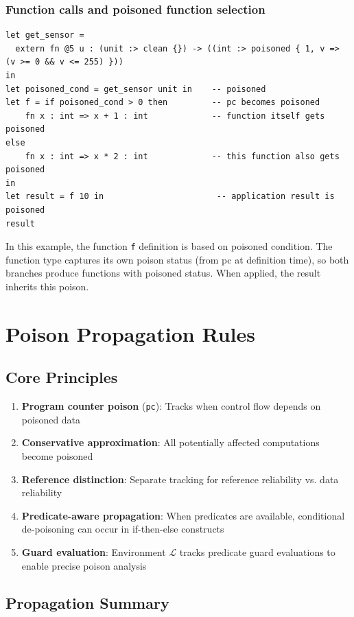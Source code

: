 \documentclass[12pt]{article}
\begin{document}
\subsubsection*{Function calls and poisoned function selection}
\begin{lstlisting}[language=poison]
let get_sensor =
  extern fn @5 u : (unit :> clean {}) -> ((int :> poisoned { 1, v => (v >= 0 && v <= 255) }))
in
let poisoned_cond = get_sensor unit in    -- poisoned
let f = if poisoned_cond > 0 then         -- pc becomes poisoned
    fn x : int => x + 1 : int             -- function itself gets poisoned
else
    fn x : int => x * 2 : int             -- this function also gets poisoned
in
let result = f 10 in                       -- application result is poisoned
result
\end{lstlisting}

In this example, the function \texttt{f} definition is based on poisoned
condition. The function type captures its own poison status (from pc at
definition time), so both branches produce functions with poisoned status. When
applied, the result inherits this poison. 

\section{Poison Propagation Rules}

\subsection{Core Principles}

\begin{enumerate}
    \item \textbf{Program counter poison} (\texttt{pc}): Tracks when control flow depends on poisoned data
    \item \textbf{Conservative approximation}: All potentially affected computations become poisoned
    \item \textbf{Reference distinction}: Separate tracking for reference reliability vs. data reliability
    \item \textbf{Predicate-aware propagation}: When predicates are available, conditional de-poisoning can occur in if-then-else constructs
    \item \textbf{Guard evaluation}: Environment $\mathcal{L}$ tracks predicate guard evaluations to enable precise poison analysis
\end{enumerate}

\subsection{Propagation Summary}
\end{document}
